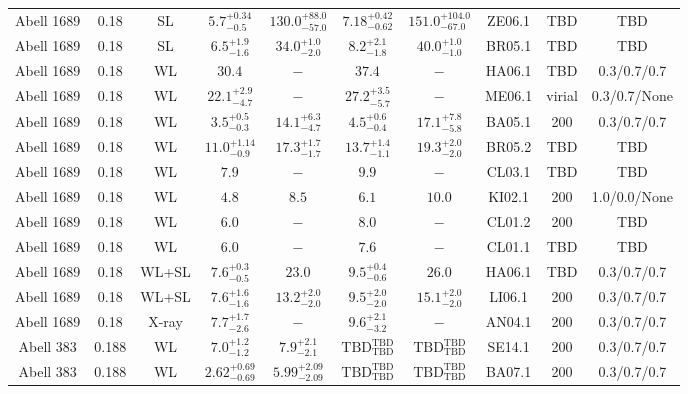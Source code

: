 \begin{table}
\begin{tabular}{cccccccccc}
Abell 1689 & 0.18 & SL & ${5.7}^{+0.34}_{-0.5}$ & ${130.0}^{+88.0}_{-57.0}$ & ${7.18}^{+0.42}_{-0.62}$ & ${151.0}^{+104.0}_{-67.0}$ & ZE06.1 & TBD & TBD \\
Abell 1689 & 0.18 & SL & ${6.5}^{+1.9}_{-1.6}$ & ${34.0}^{+1.0}_{-2.0}$ & ${8.2}^{+2.1}_{-1.8}$ & ${40.0}^{+1.0}_{-1.0}$ & BR05.1 & TBD & TBD \\
Abell 1689 & 0.18 & WL & ${30.4}^{}_{}$ & ${-}^{}_{}$ & ${37.4}^{}_{}$ & ${-}^{}_{}$ & HA06.1 & TBD & 0.3/0.7/0.7 \\
Abell 1689 & 0.18 & WL & ${22.1}^{+2.9}_{-4.7}$ & ${-}^{}_{}$ & ${27.2}^{+3.5}_{-5.7}$ & ${-}^{}_{}$ & ME06.1 & virial & 0.3/0.7/None \\
Abell 1689 & 0.18 & WL & ${3.5}^{+0.5}_{-0.3}$ & ${14.1}^{+6.3}_{-4.7}$ & ${4.5}^{+0.6}_{-0.4}$ & ${17.1}^{+7.8}_{-5.8}$ & BA05.1 & 200 & 0.3/0.7/0.7 \\
Abell 1689 & 0.18 & WL & ${11.0}^{+1.14}_{-0.9}$ & ${17.3}^{+1.7}_{-1.7}$ & ${13.7}^{+1.4}_{-1.1}$ & ${19.3}^{+2.0}_{-2.0}$ & BR05.2 & TBD & TBD \\
Abell 1689 & 0.18 & WL & ${7.9}^{}_{}$ & ${-}^{}_{}$ & ${9.9}^{}_{}$ & ${-}^{}_{}$ & CL03.1 & TBD & TBD \\
Abell 1689 & 0.18 & WL & ${4.8}^{}_{}$ & ${8.5}^{}_{}$ & ${6.1}^{}_{}$ & ${10.0}^{}_{}$ & KI02.1 & 200 & 1.0/0.0/None \\
Abell 1689 & 0.18 & WL & ${6.0}^{}_{}$ & ${-}^{}_{}$ & ${8.0}^{}_{}$ & ${-}^{}_{}$ & CL01.2 & 200 & TBD \\
Abell 1689 & 0.18 & WL & ${6.0}^{}_{}$ & ${-}^{}_{}$ & ${7.6}^{}_{}$ & ${-}^{}_{}$ & CL01.1 & TBD & TBD \\
Abell 1689 & 0.18 & WL+SL & ${7.6}^{+0.3}_{-0.5}$ & ${23.0}^{}_{}$ & ${9.5}^{+0.4}_{-0.6}$ & ${26.0}^{}_{}$ & HA06.1 & TBD & 0.3/0.7/0.7 \\
Abell 1689 & 0.18 & WL+SL & ${7.6}^{+1.6}_{-1.6}$ & ${13.2}^{+2.0}_{-2.0}$ & ${9.5}^{+2.0}_{-2.0}$ & ${15.1}^{+2.0}_{-2.0}$ & LI06.1 & 200 & 0.3/0.7/0.7 \\
Abell 1689 & 0.18 & X-ray & ${7.7}^{+1.7}_{-2.6}$ & ${-}^{}_{}$ & ${9.6}^{+2.1}_{-3.2}$ & ${-}^{}_{}$ & AN04.1 & 200 & 0.3/0.7/0.7 \\
Abell 383 & 0.188 & WL & ${7.0}^{+1.2}_{-1.2}$ & ${7.9}^{+2.1}_{-2.1}$ & ${\mathrm{TBD}}^{\mathrm{TBD}}_{\mathrm{TBD}}$ & ${\mathrm{TBD}}^{\mathrm{TBD}}_{\mathrm{TBD}}$ & SE14.1 & 200 & 0.3/0.7/0.7 \\
Abell 383 & 0.188 & WL & ${2.62}^{+0.69}_{-0.69}$ & ${5.99}^{+2.09}_{-2.09}$ & ${\mathrm{TBD}}^{\mathrm{TBD}}_{\mathrm{TBD}}$ & ${\mathrm{TBD}}^{\mathrm{TBD}}_{\mathrm{TBD}}$ & BA07.1 & 200 & 0.3/0.7/0.7 \\

\end{tabular}
\end{table}
